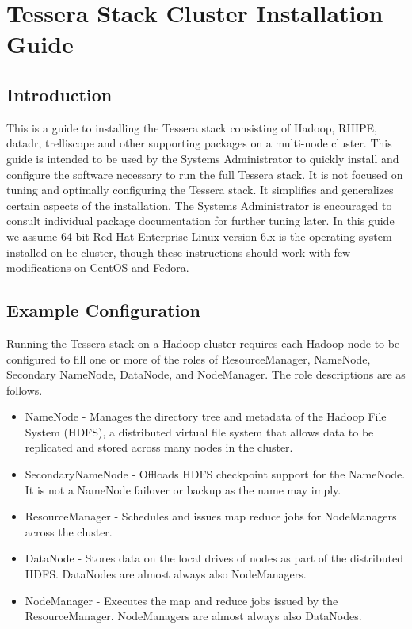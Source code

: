 \section{Tessera Stack Cluster Installation Guide}
\subsection{Introduction}
This is a guide to installing the Tessera stack consisting of
Hadoop\textregistered, RHIPE, datadr, trelliscope and other supporting
packages on a multi-node cluster.  This guide is intended to be used
by the Systems Administrator to quickly install and configure the
software necessary to run the full Tessera stack.  It is not focused
on tuning and optimally configuring the Tessera stack.  It simplifies
and generalizes certain aspects of the installation.  The Systems
Administrator is encouraged to consult individual package
documentation for further tuning later.  In this guide we assume
64-bit Red Hat Enterprise Linux version 6.x is the operating system
installed on he cluster, though these instructions should work with
few modifications on CentOS and Fedora.

\subsection{Example Configuration}
Running the Tessera stack on a Hadoop cluster requires each Hadoop node
to be configured to fill one or more of the roles of ResourceManager,
NameNode, Secondary NameNode, DataNode, and NodeManager. The role
descriptions are as follows.

\begin{itemize}
\item NameNode - Manages the directory tree and metadata of the Hadoop File System (HDFS), a distributed virtual file system that allows data to be replicated and stored across many nodes in the cluster. 
\item SecondaryNameNode - Offloads HDFS checkpoint support for the NameNode.  It is not a NameNode failover or backup as the name may imply.
\item ResourceManager - Schedules and issues map reduce jobs for NodeManagers across the cluster.
\item DataNode - Stores data on the local drives of nodes as part of the distributed HDFS.  DataNodes are almost always also NodeManagers.
\item NodeManager - Executes the map and reduce jobs issued by the ResourceManager. NodeManagers are almost always also DataNodes.
\end{itemize}

